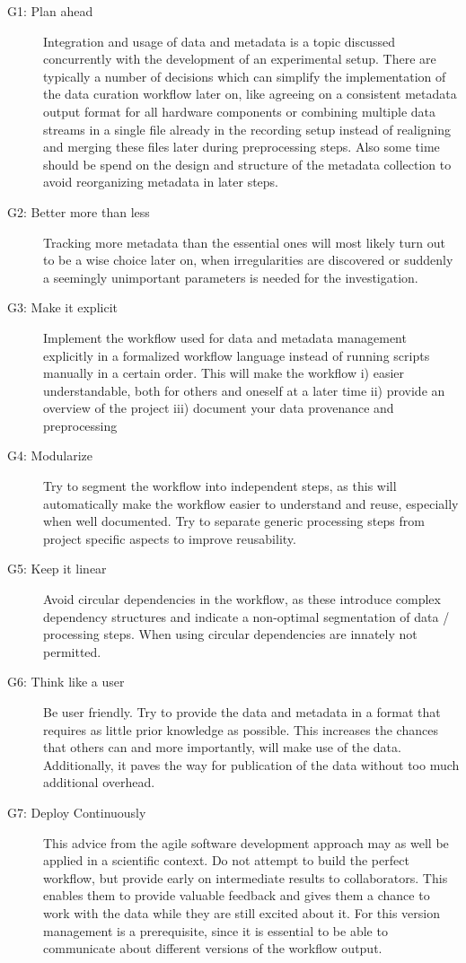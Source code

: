\begin{description}
 \item[G1: Plan ahead] Integration and usage of data and metadata is a topic discussed concurrently with the development of an experimental setup. There are typically a number of decisions which can simplify the implementation of the data curation workflow later on, like agreeing on a consistent metadata output format for all hardware components or combining multiple data streams in a single file already in the recording setup instead of realigning and merging these files later during preprocessing steps. Also some time should be spend on the design and structure of the metadata collection to avoid reorganizing metadata in later steps.
 \item[G2: Better more than less] Tracking more metadata than the essential ones will most likely turn out to be a wise choice later on, when irregularities are discovered or suddenly a seemingly unimportant parameters is needed for the investigation.
 \item[G3: Make it explicit] Implement the workflow used for data and metadata management explicitly in a formalized workflow language instead of running scripts manually in a certain order. This will make the workflow i) easier understandable, both for others and oneself at a later time ii) provide an overview of the project iii) document your data provenance and preprocessing
 \item[G4: Modularize] Try to segment the  workflow into independent steps, as this will automatically make the workflow easier to understand and reuse, especially when well documented. Try to separate generic processing steps from project specific aspects to improve reusability.
 \item[G5: Keep it linear] Avoid circular dependencies in the  workflow, as these introduce complex dependency structures and indicate a non-optimal segmentation of data / processing steps. When using  circular dependencies are innately not permitted.
 \item[G6: Think like a user] Be user friendly. Try to provide the data and metadata in a format that requires as little prior knowledge as possible. This increases the chances that others can and more importantly, will make use of the data. Additionally, it paves the way for publication of the data without too much additional overhead.
 \item[G7: Deploy Continuously] This advice from the agile software development approach may as well be applied in a scientific context. Do not attempt to build the perfect workflow, but provide early on intermediate results to collaborators. This enables them to provide valuable feedback and gives them a chance to work with the data while they are still excited about it. For this version management is a prerequisite, since it is essential to be able to communicate about different versions of the workflow output.
\end{description}
